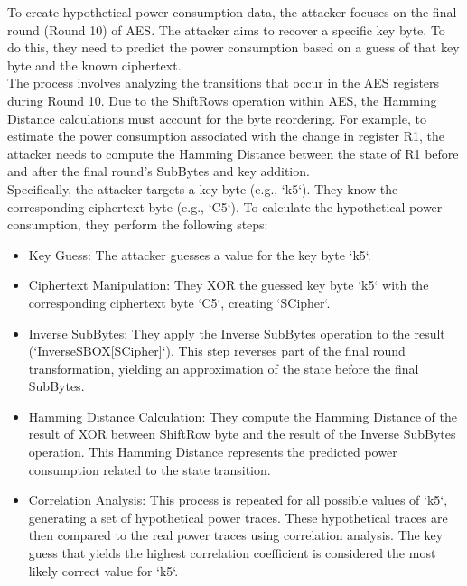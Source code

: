 \documentclass[12pt, letterpaper, oneside]{report}
\begin{document}
To create hypothetical power consumption data, the attacker focuses on the final round 
(Round 10) of AES. The attacker aims to recover a specific key byte. To do this, they need to predict the power consumption based on a guess of that key byte and the known ciphertext.\\

The process involves analyzing the transitions that occur in the AES registers during Round 10. Due to the ShiftRows operation within AES, the Hamming Distance calculations must account for the byte reordering. For example, to estimate the power consumption associated with the change in register R1, the attacker needs to compute the Hamming Distance between the state of R1 before and after the final round's SubBytes and key addition.\\

Specifically, the attacker targets a key byte (e.g., `k5`). They know the corresponding ciphertext byte (e.g., `C5`). To calculate the hypothetical power consumption, they perform the following steps:\\

\begin{itemize}
    \item Key Guess: The attacker guesses a value for the key byte `k5`.
    \item Ciphertext Manipulation: They XOR the guessed key byte `k5` with the corresponding ciphertext byte `C5`, creating `SCipher`.
    \item Inverse SubBytes: They apply the Inverse SubBytes operation to the result \\
    (`InverseSBOX[SCipher]`). 
    This step reverses part of the final round transformation, yielding an approximation of the state before the final SubBytes.
    \item Hamming Distance Calculation: They compute the Hamming Distance of the result of XOR between ShiftRow byte and the result of the Inverse SubBytes operation. This Hamming Distance represents the predicted power consumption related to the state transition.
    \item Correlation Analysis: This process is repeated for all possible values of `k5`, generating a set of hypothetical power traces. These hypothetical traces are then compared to the real power traces using correlation analysis. The key guess that yields the highest correlation coefficient is considered the most likely correct value for `k5`.
\end{itemize}
\end{document}

